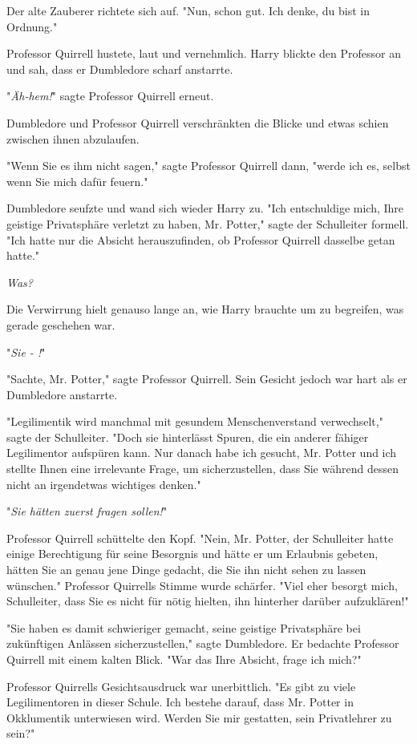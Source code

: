 {Der alte Zauberer richtete sich auf. "Nun, schon gut. Ich denke, du bist in Ordnung."

Professor Quirrell hustete, laut und vernehmlich. Harry blickte den Professor an und sah, dass er Dumbledore scharf anstarrte.

"\emph{Äh-hem!}" sagte Professor Quirrell erneut.

Dumbledore und Professor Quirrell verschränkten die Blicke und etwas schien zwischen ihnen abzulaufen.

"Wenn Sie es ihm nicht sagen," sagte Professor Quirrell dann, "werde ich es, selbst wenn Sie mich dafür feuern."

Dumbledore seufzte und wand sich wieder Harry zu. "Ich entschuldige mich, Ihre geistige Privatsphäre verletzt zu haben, Mr. Potter," sagte der Schulleiter formell. "Ich hatte nur die Absicht herauszufinden, ob Professor Quirrell dasselbe getan hatte."

\emph{Was?}

Die Verwirrung hielt genauso lange an, wie Harry brauchte um zu begreifen, was gerade geschehen war.

"\emph{Sie - !}"

"Sachte, Mr. Potter," sagte Professor Quirrell. Sein Gesicht jedoch war hart als er Dumbledore anstarrte.

"Legilimentik wird manchmal mit gesundem Menschenverstand verwechselt," sagte der Schulleiter. "Doch sie hinterlässt Spuren, die ein anderer fähiger Legilimentor aufspüren kann. Nur danach habe ich gesucht, Mr. Potter und ich stellte Ihnen eine irrelevante Frage, um sicherzustellen, dass Sie während dessen nicht an irgendetwas wichtiges denken."

"\emph{Sie hätten zuerst fragen sollen!}"

Professor Quirrell schüttelte den Kopf. "Nein, Mr. Potter, der Schulleiter hatte einige Berechtigung für seine Besorgnis und hätte er um Erlaubnis gebeten, hätten Sie an genau jene Dinge gedacht, die Sie ihn nicht sehen zu lassen wünschen." Professor Quirrells Stimme wurde schärfer. "Viel eher besorgt mich, Schulleiter, dass Sie es nicht für nötig hielten, ihn hinterher darüber aufzuklären!"

"Sie haben es damit schwieriger gemacht, seine geistige Privatsphäre bei zukünftigen Anlässen sicherzustellen," sagte Dumbledore. Er bedachte Professor Quirrell mit einem kalten Blick. "War das Ihre Absicht, frage ich mich?"

Professor Quirrells Gesichtsausdruck war unerbittlich. "Es gibt zu viele Legilimentoren in dieser Schule. Ich bestehe darauf, dass Mr. Potter in Okklumentik unterwiesen wird. Werden Sie mir gestatten, sein Privatlehrer zu sein?"

}

